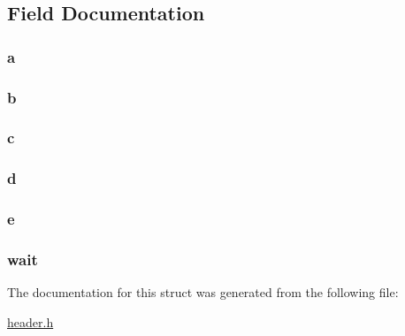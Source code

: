 \subsection{Field Documentation}
\hypertarget{structt__skill__list_a39a494bb9ce01ba13ea4577fe2b1cc79}{
\subsubsection[{a}]{ a}}\label{structt__skill__list_a39a494bb9ce01ba13ea4577fe2b1cc79}
\hypertarget{structt__skill__list_a85ae40dbaecefd131b936ec65e9f4809}{
\subsubsection[{b}]{ b}}\label{structt__skill__list_a85ae40dbaecefd131b936ec65e9f4809}
\hypertarget{structt__skill__list_ac9055dd2d5c45c223e3b0e1920c31493}{
\subsubsection[{c}]{ c}}\label{structt__skill__list_ac9055dd2d5c45c223e3b0e1920c31493}
\hypertarget{structt__skill__list_a0bb2c4a26ff65aecd7a36ad7ee898cd8}{
\subsubsection[{d}]{ d}}\label{structt__skill__list_a0bb2c4a26ff65aecd7a36ad7ee898cd8}
\hypertarget{structt__skill__list_aa756d3dbc91762775cff0f4b52526a70}{
\subsubsection[{e}]{ e}}\label{structt__skill__list_aa756d3dbc91762775cff0f4b52526a70}
\hypertarget{structt__skill__list_a2a4af1a4acb8da6061990f9bd8d0a564}{
\subsubsection[{wait}]{ wait}}\label{structt__skill__list_a2a4af1a4acb8da6061990f9bd8d0a564}


The documentation for this struct was generated from the following file\-:\begin{DoxyCompactItemize}
\item 
\hyperlink{header_8h}{header.\-h}\end{DoxyCompactItemize}
